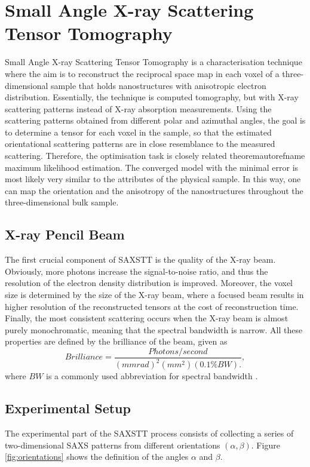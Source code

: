 \chapter{Small Angle X-ray Scattering Tensor Tomography}
\label{chap:SAXSTT}

Small Angle X-ray Scattering Tensor Tomography is a characterisation technique where the aim is to reconstruct the reciprocal space map in each voxel of a three-dimensional sample
that holds nanostructures with anisotropic electron distribution. Essentially, the technique is computed tomography, but with X-ray scattering patterns instead of X-ray absorption measurements.
Using the scattering patterns obtained from different polar and azimuthal angles, the goal is to determine a tensor for each voxel in the sample,
so that the estimated orientational scattering patterns are in close resemblance to the measured scattering.
Therefore, the optimisation task is closely related theoremautorefname maximum likelihood estimation. The converged model with the minimal error is most likely very similar to the attributes of the physical sample.
In this way, one can map the orientation and the anisotropy of the nanostructures throughout the three-dimensional bulk sample.

\section{X-ray Pencil Beam} %
The first crucial component of SAXSTT is the quality of the X-ray beam.
Obviously, more photons increase the signal-to-noise ratio, and thus the resolution of the electron density distribution is improved.
Moreover, the voxel size is determined by the size of the X-ray beam, where a focused beam results in higher resolution of the reconstructed tensors at the cost of reconstruction time.
Finally, the most consistent scattering occurs when the X-ray beam is almost purely monochromatic, meaning that the spectral bandwidth is narrow.
All these properties are defined by the brilliance of the beam, given as
\begin{equation}\label{eq:brilliance}
    Brilliance = \frac{Photons/second}{\left( mmrad \right)^{2} \left( mm^{2} \right) \left( 0.1\% BW \right).},
\end{equation}
where $BW$ is a commonly used abbreviation for spectral bandwidth \cite{mcmorrow2011elements}.

\section{Experimental Setup}
The experimental part of the SAXSTT process consists of collecting a series of two-dimensional SAXS patterns from different orientations $\left(\alpha,\beta\right)$.
Figure \ref{fig:orientations} shows the definition of the angles $\alpha$ and $\beta$. %

